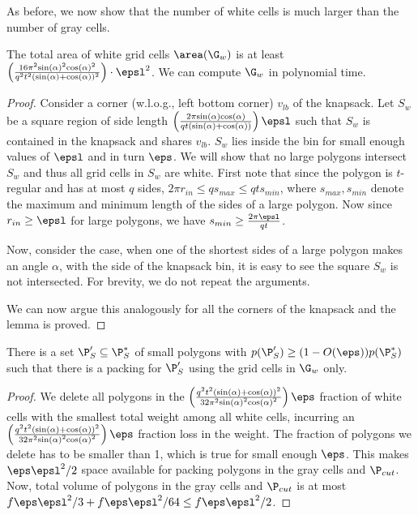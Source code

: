 As before, we now show that the number of white cells is much larger than the number of gray cells.

\begin{lem} \label{lem:white-polygons}
	The total area of white grid cells $\area(\G_{w})$ is at least $\left ( \frac{16 \pi^2 {\sin(\alpha)}^2{\cos(\alpha)}^2}{q^2 t^2 (\sin(\alpha)+\cos(\alpha))^2} \right )\cdot \epsl^2$. We can compute $\G_w$ in polynomial time.
\end{lem}
\begin{proof}
	Consider a corner (w.l.o.g., left bottom corner) $v_{lb}$ of the knapsack. Let  $S_w$ be a square region of side length $\left ( \frac{2 \pi {\sin(\alpha)}{\cos(\alpha)}}{q t (\sin(\alpha)+\cos(\alpha))} \right ) \epsl$ such that $S_w$ is contained in the knapsack and shares $v_{lb}$. $S_w$ lies inside the bin for small enough values of $\epsl$ and in turn $\eps$.
	We will show that no large polygons intersect $S_w$ and thus all grid cells in $S_w$ are white.
	First note that since the polygon is $t$-regular and has at most $q$ sides, 
	$2\pi r_{in} \le q s_{max} \le q t s_{min}$, where $s_{max}, s_{min}$ denote the maximum and minimum length of the sides of a large polygon.
	Now since $r_{in} \ge \epsl$ for large polygons, we have $s_{min} \ge \frac{2\pi \epsl}{q t}$.
	
	Now, consider the case, when one of the shortest sides of a large polygon makes an angle $\alpha$, with the side of the knapsack bin, 
	it is easy to see the square $S_w$ is not intersected. For brevity, we do not repeat the arguments. 
	
	
	
	We can now argue this analogously for all the corners of the knapsack and the lemma is proved. 
\end{proof}

\begin{lem} \label{lem:small-circles-white-grid-cells}There
	is a set $\P'_S \subseteq \P^*_S$ of small polygons with
	$p(\P'_S)\ge (1-O(\eps)) p(\P^*_S)$
	such that there is a packing for $\P'_S$ using the grid cells in $\G_w$ only.
\end{lem}
\begin{proof}
	We delete all polygons in the $\left( \frac{q^2 t^2 (\sin(\alpha)+\cos(\alpha))^2}{32 \pi^2 {\sin(\alpha)}^2{\cos(\alpha)}^2}\right)\eps$ fraction of white cells with the smallest total
	weight among all white cells, incurring an $\left( \frac{q^2 t^2 (\sin(\alpha)+\cos(\alpha))^2}{32 \pi^2 {\sin(\alpha)}^2{\cos(\alpha)}^2}\right) \eps$ fraction loss in the weight. The fraction of polygons we delete has to be smaller than 1, which is true for small enough $\eps$.
	This makes $\eps \epsl^2 /2$ space available for packing polygons in the gray cells and $\P_{cut}$. 
	Now, total volume of polygons in the gray cells and $\P_{cut}$ is at most  $f \eps \epsl^2/3 + f \eps \epsl^2/64 \le f \eps \epsl^2 /2$.
\end{proof}

